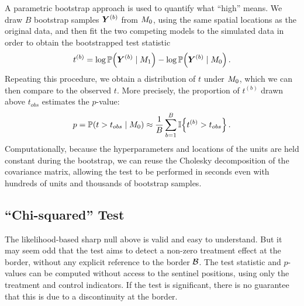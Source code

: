     A parametric bootstrap approach is used to quantify what ``high'' means. We draw \(B\) bootstrap samples \(\bm{Y}^{(b)}\) from \(M_0\),
using the same spatial locations as the original data,
and then fit the two competing models to the simulated data in order to obtain the bootstrapped test statistic
\begin{equation}
    t^{(b)} = \log \Pr\del{\Yvec^{(b)} \mid \modalt} - \log \Pr\del{\Yvec^{(b)} \mid \modnull}\,.
\end{equation}
Repeating this procedure, we obtain a distribution of \(t\) under \(M_0\),
which we can then compare to the observed \(t\).
More precisely, the proportion of \(t^{(b)}\) drawn above \(t_{obs}\) estimates the \(p\)-value:
\begin{equation}
    p = \Pr\del{t > t_{obs} \mid \modnull}
                     \approx \frac{1}{B} \sum_{b=1}^B \Ind\cbr{t^{(b)} > t_{obs}}
                     \,.
\end{equation}
Computationally, because the hyperparameters and locations of the units are held constant during the bootstrap, we can reuse the Cholesky decomposition of the covariance matrix, allowing the test to be performed in seconds even with hundreds of units and thousands of bootstrap samples.

\subsection{``Chi-squared'' Test}
The likelihood-based sharp null above is valid and easy to understand.
But it may seem odd that the test aims to detect a non-zero treatment effect at the border, without any explicit reference to the border \(\mathcal{B}\).
The test statistic and \(p\)-values can be computed without access to the sentinel positions, using only the treatment and control indicators.
If the test is significant, there is no guarantee that this is due to a discontinuity at the border.

